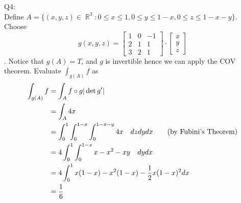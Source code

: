 \documentclass[letterpaper]{article}
\DeclareMathOperator{\R}{\mathbb{R}}
\begin{document}
\noindent Q4: \\ Define $A = \{ (x,y,z)\in \R^3 : 0\leq x \leq 1, 0\leq y\leq 1-x, 0\leq z \leq 1-x-y\}$. Choose $$g(x,y,z) = \begin{bmatrix} 1 & 0 & -1 \\ 2 & 1 & 1 \\ 3 & 2 & 1\end{bmatrix} \cdot \begin{bmatrix} x \\ y \\ z \end{bmatrix}$$. Notice that $g(A)=T$, and $g$ is invertible hence we can apply the COV theorem. Evaluate $\int_{g(A)}f$ as 
\begin{align*}
    \int_{g(A)}f & = \int_A f\circ g |\det g^\prime |
    \\ & =\int_A 4x
    \\ & = \int_0^1 \int_0^{1-x} \int_0^{1-x-y} 4x\quad dz \space dy \space dx \tag{by Fubini's Theorem}
    \\ & = 4\int_0^1 \int_0^{1-x} x-x^2-xy \quad dy \space dx
    \\ & = 4\int_0^1 x(1-x) -x^2(1-x) -\frac{1}{2}x(1-x)^2 dx
    \\ & = \frac{1}{6}
\end{align*}
\end{document}
